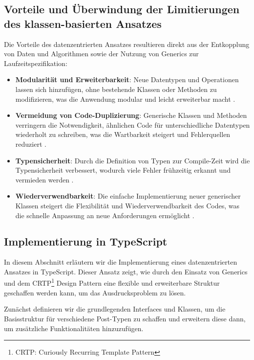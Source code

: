 \documentclass{easychair}
\begin{document}
  \subsection{Vorteile und Überwindung der Limitierungen des klassen-basierten Ansatzes}

  Die Vorteile des datenzentrierten Ansatzes resultieren direkt aus der Entkopplung von Daten und Algorithmen sowie der Nutzung von Generics zur Laufzeitspezifikation:

\begin{itemize}
    \item \textbf{Modularität und Erweiterbarkeit}: Neue Datentypen und Operationen lassen sich hinzufügen, ohne bestehende Klassen oder Methoden zu modifizieren, was die Anwendung modular und leicht erweiterbar macht \cite{torgersen2004expression}.
    \item \textbf{Vermeidung von Code-Duplizierung}: Generische Klassen und Methoden verringern die Notwendigkeit, ähnlichen Code für unterschiedliche Datentypen wiederholt zu schreiben, was die Wartbarkeit steigert und Fehlerquellen reduziert \cite{typescript2019deepdive}.
    \item \textbf{Typensicherheit}: Durch die Definition von Typen zur Compile-Zeit wird die Typensicherheit verbessert, wodurch viele Fehler frühzeitig erkannt und vermieden werden \cite{rozentals2019typescript}.
    \item \textbf{Wiederverwendbarkeit}: Die einfache Implementierung neuer generischer Klassen steigert die Flexibilität und Wiederverwendbarkeit des Codes, was die schnelle Anpassung an neue Anforderungen ermöglicht \cite{typescript2019deepdive}.
\end{itemize}

\subsection{Implementierung in TypeScript}

In diesem Abschnitt erläutern wir die Implementierung eines datenzentrierten Ansatzes in TypeScript. Dieser Ansatz zeigt, wie durch den Einsatz von Generics und dem CRTP\footnote{CRTP: Curiously Recurring Template Pattern} Design Pattern eine flexible und erweiterbare Struktur geschaffen werden kann, um das Ausdrucksproblem zu lösen.

Zunächst definieren wir die grundlegenden Interfaces und Klassen, um die Basisstruktur für verschiedene Post-Typen zu schaffen und erweitern diese dann, um zusätzliche Funktionalitäten hinzuzufügen.
\end{document}
